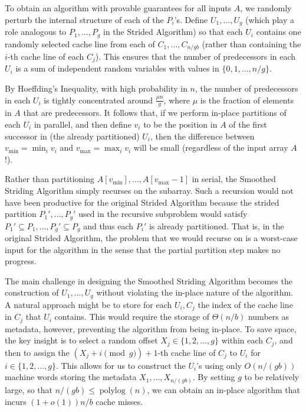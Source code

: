 \documentclass[11pt]{article}
\newcommand{\polylog}{\operatorname{polylog}}
\renewcommand{\paragraph}[1]{\vspace{0.09in}\noindent{\bf \boldmath #1.}}
\theoremstyle{remark}
\theoremstyle{remark}
\begin{document}

\paragraph{The Smoothed Striding Algorithm}
To obtain an algorithm with provable guarantees for all inputs $A$, we
randomly perturb the internal structure of each of the $P_i$'s. Define
$U_1, \ldots, U_{g}$ (which play a role analogous to $P_1,
\ldots, P_g$ in the Strided Algorithm) so that each $U_i$ contains one
randomly selected cache line from each of $C_1, \ldots, C_{n /
gb}$ (rather than containing the $i$-th cache line of each
$C_j$). This ensures that the number of predecessors in each $U_i$ is
a sum of independent random variables with values in $\{0, 1, \ldots,
n/g\}$.

By Hoeffding's Inequality, with high probability in $n$, the number of
predecessors in each $U_i$ is tightly concentrated around $\frac{\mu
n}{g}$, where $\mu$ is the fraction of elements in $A$ that are
predecessors. It follows that, if we perform in-place partitions of
each $U_i$ in parallel, and then define $v_i$ to be the position in
$A$ of the first successor in (the already partitioned) $U_i$, then
the difference between $v_{\text{min}} = \min_i v_i$ and
$v_{\text{max}} = \max_i v_i$ will be small (regardless of the input array
$A$!).

Rather than partitioning $A[v_{\text{min}}],\ldots,
A[v_{\text{max}}-1]$ in serial, the Smoothed Striding Algorithm simply
recurses on the subarray. Such a recursion would not have been
productive for the original Strided Algorithm because the strided
partition $P_1', \ldots, P_g'$ used in the recursive subproblem would
satisfy $P_1' \subseteq P_1, \ldots, P_g' \subseteq P_g$ and thus each
$P_i'$ is already partitioned. That is, in the original Strided
Algorithm, the problem that we would recurse on is a worst-case input
for the algorithm in the sense that the partial partition step makes
no progress.

The main challenge in designing the Smoothed Striding Algorithm
becomes the construction of $U_1, \ldots, U_{g}$ without
violating the in-place nature of the algorithm. A natural approach
might be to store for each $U_i, C_j$ the index of the cache
line in $C_j$ that $U_i$ contains. This would require the storage of
$\Theta(n / b)$ numbers as metadata, however, preventing the algorithm
from being in-place. To save space, the key insight is to select a
random offset $X_j \in \{1, 2, \ldots, g\}$ within each $C_j$, and
then to assign the $(X_j + i \pmod g) + 1$-th cache line of $C_j$ to
$U_i$ for $i \in \{1, 2, \ldots, g\}$. This allows for us to construct
the $U_i$'s using only $O(n/(gb))$ machine words
storing the metadata $X_1, \ldots, X_{n / (gb)}$. By setting $g$ to
be relatively large, so that $n/(gb) \le \polylog(n)$, we can
obtain an in-place algorithm that incurs $(1 + o(1))n/b$ cache
misses.
\end{document}
